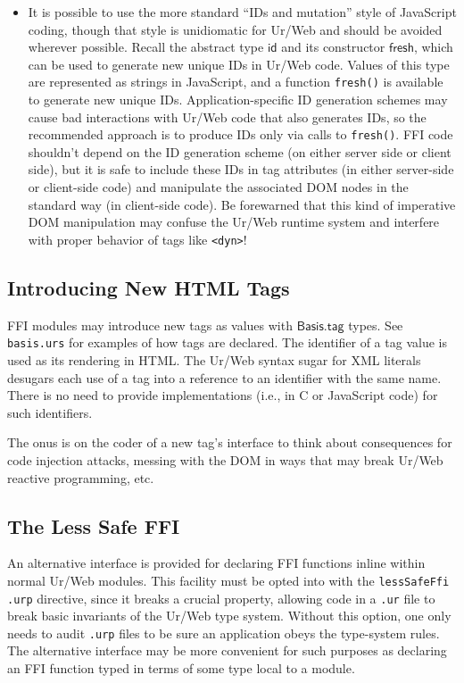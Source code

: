 \documentclass{article}
\newcommand{\cd}[1]{\texttt{#1}}
\newcommand{\mt}[1]{\mathsf{#1}}
\begin{document}
\begin{itemize}
\item It is possible to use the more standard ``IDs and mutation'' style of JavaScript coding, though that style is unidiomatic for Ur/Web and should be avoided wherever possible.  Recall the abstract type $\mt{id}$ and its constructor $\mt{fresh}$, which can be used to generate new unique IDs in Ur/Web code.  Values of this type are represented as strings in JavaScript, and a function \cd{fresh()} is available to generate new unique IDs.  Application-specific ID generation schemes may cause bad interactions with Ur/Web code that also generates IDs, so the recommended approach is to produce IDs only via calls to \cd{fresh()}.  FFI code shouldn't depend on the ID generation scheme (on either server side or client side), but it is safe to include these IDs in tag attributes (in either server-side or client-side code) and manipulate the associated DOM nodes in the standard way (in client-side code).  Be forewarned that this kind of imperative DOM manipulation may confuse the Ur/Web runtime system and interfere with proper behavior of tags like \cd{<dyn>}!
\end{itemize}

\subsection{Introducing New HTML Tags}

FFI modules may introduce new tags as values with $\mt{Basis.tag}$ types.  See \texttt{basis.urs} for examples of how tags are declared.  The identifier of a tag value is used as its rendering in HTML.  The Ur/Web syntax sugar for XML literals desugars each use of a tag into a reference to an identifier with the same name.  There is no need to provide implementations (i.e., in C or JavaScript code) for such identifiers.

The onus is on the coder of a new tag's interface to think about consequences for code injection attacks, messing with the DOM in ways that may break Ur/Web reactive programming, etc.

\subsection{The Less Safe FFI}
\label{sec:lessSafeFfi}

An alternative interface is provided for declaring FFI functions inline within normal Ur/Web modules.  This facility must be opted into with the \texttt{lessSafeFfi} \texttt{.urp} directive, since it breaks a crucial property, allowing code in a \texttt{.ur} file to break basic invariants of the Ur/Web type system.  Without this option, one only needs to audit \texttt{.urp} files to be sure an application obeys the type-system rules.  The alternative interface may be more convenient for such purposes as declaring an FFI function typed in terms of some type local to a module.
\end{document}

